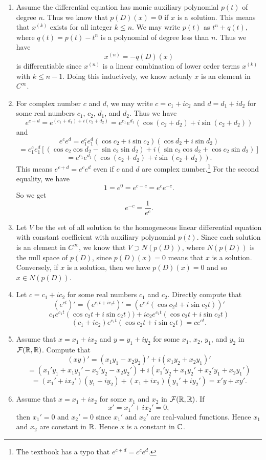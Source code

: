 \begin{enumerate}
\begin{enumerate}
\item Assume the differential equation has monic auxiliary polynomial $p(t)$ of degree $n$. Thus we know that $p(D)(x)=0$ if $x$ is a solution. This means that $x^{(k)}$ exists for all integer $k\leq n$. We may write $p(t)$ as $t^n+q(t)$, where $q(t)=p(t)-t^n$ is a polynomial of degree less than $n$. Thus we have 
\[x^{(n)}=-q(D)(x)\]
is differentiable since $x^{(n)}$ is a linear combination of lower order terms $x^{(k)}$ with $k\leq n-1$. Doing this inductively, we know actualy $x$ is an element in $C^{\infty}$.
\item For complex number $c$ and $d$, we may write $c=c_1+ic_2$ and $d=d_1+id_2$ for some real numbers $c_1$, $c_2$, $d_1$, and $d_2$. Thus we have 
\[e^{c+d}=e^{(c_1+d_1)+i(c_2+d_2)}=e^{c_1}e^{d_1}(\cos (c_2+d_2)+i\sin (c_2+d_2))\]
and 
\[e^ce^d=e^c_1e^d_1(\cos c_2+i\sin c_2)(\cos d_2 +i\sin d_2)\]
\[=e^c_1e^d_1[(\cos c_2\cos d_2-\sin c_2\sin d_2)+i(\sin c_2\cos d_2 +\cos c_2\sin d_2)]\]
\[=e^{c_1}e^{d_1}(\cos (c_2+d_2)+i\sin (c_2+d_2)).\]
This means $e^{c+d}=e^ce^d$ even if $c$ and $d$ are complex number.\footnote{The textbook has a typo that $e^{c+d}=c^ce^d$.} For the second equality, we have 
\[1=e^{0}=e^{c-c}=e^{c}e^{-c}.\]
So we get 
\[e^{-c}=\frac{1}{e^c}.\]
\item Let $V$ be the set of all solution to the homogeneous linear differential equation with constant coefficient with auxiliary polynomial $p(t)$. Since each solution is an element in $C^{\infty}$, we know that $V\supset N(p(D))$, where $N(p(D))$ is the null space of $p(D)$, since $p(D)(x)=0$ means that $x$ is a solution. Conversely, if $x$ is a solution, then we have $p(D)(x)=0$ and so $x\in N(p(D))$.
\item Let $c=c_1+ic_2$ for some real numbers $c_1$ and $c_2$. Directly compute that 
\[(e^{ct})'=(e^{c_1t+ic_2t})'=(e^{c_1t}(\cos c_2t+i\sin c_2t))'\]
\[c_1e^{c_1t}(\cos c_2t+i\sin c_2t))+ic_2e^{c_1t}(\cos c_2t+i\sin c_2t)\]
\[(c_1+ic_2)e^{c_1t}(\cos c_2t+i\sin c_2t)=ce^{ct}.\]
\item Assume that $x=x_1+ix_2$ and $y=y_1+iy_2$ for some $x_1$, $x_2$, $y_1$, and $y_2$ in $\mathcal{F}(\mathbb{R},\mathbb{R})$. Compute that 
\[(xy)'=(x_1y_1-x_2y_2)'+i(x_1y_2+x_2y_1)'\]
\[=(x_1'y_1+x_1y_1'-x_2'y_2-x_2y_2')+i(x_1'y_2+x_1y_2'+x_2'y_1+x_2y_1')\]
\[=(x_1'+ix_2')(y_1+iy_2)+(x_1+ix_2)(y_1'+iy_2')=x'y+xy'.\]
\item Assume that $x=x_1+ix_2$ for some $x_1$ and $x_2$ in $\mathcal{F}(\mathbb{R},\mathbb{R})$. If 
\[x'=x_1'+ix_2'=0,\]
then $x_1'=0$ and $x_2'=0$ since $x_1'$ and $x_2'$ are real-valued functions. Hence $x_1$ and $x_2$ are constant in $\mathbb{R}$. Hence $x$ is a constant in $\mathbb{C}$.
\end{enumerate}
\end{enumerate}